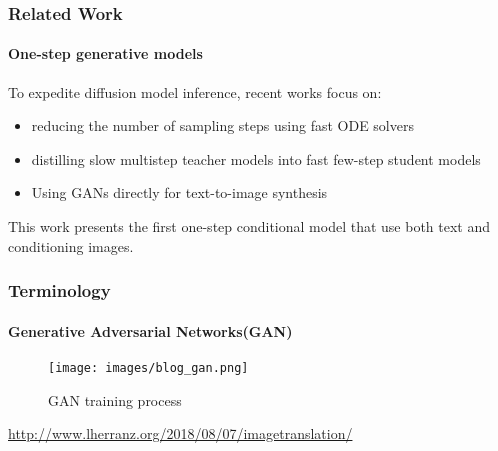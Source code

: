\documentclass[aspectratio=169, lecture, amberg]{OTHAWbeamer}
\begin{document}
\begin{frame}
\frametitle{Related Work}
\framesubtitle{One-step generative models}
To expedite diffusion model inference, recent works focus on:
\begin{itemize}
    \item reducing the number of sampling steps using fast ODE solvers \cite{karras2022elucidating, lu2022dpmsolver}
    \item distilling slow multistep teacher models into fast few-step student models \cite{meng2022sdedit, salimans2022progressive}
    \item Using GANs directly for text-to-image synthesis \cite{kang2023scaling, sauer2023stylegant}
\end{itemize}

This work presents the first one-step conditional model that use both text and conditioning images.
\end{frame}

\begin{frame}
\frametitle{Terminology}
\framesubtitle{Generative Adversarial Networks(GAN)}
\begin{figure}
    \centering
    \texttt{[image: images/blog\_gan.png]}
    \caption{GAN training process}
\end{figure}
\tiny{\footnotemark \url{http://www.lherranz.org/2018/08/07/imagetranslation/}}
\end{frame}
\note{}
\end{document}
